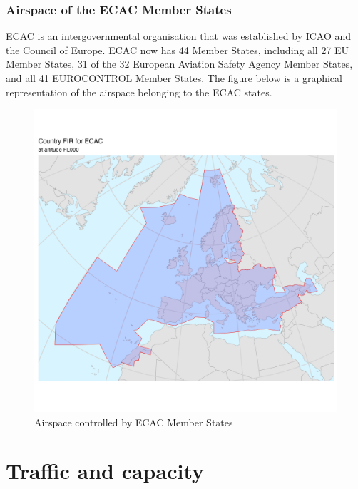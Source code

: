 \documentclass[
  11pt,
  a4paper,
]{book}
\begin{document}
\hypertarget{airspace-of-the-ecac-member-states}{%
\section*{Airspace of the ECAC Member
States}\label{airspace-of-the-ecac-member-states}}


ECAC is an intergovernmental organisation that was established by ICAO
and the Council of Europe. ECAC now has 44 Member States, including all
27 EU Member States, 31 of the 32 European Aviation Safety Agency Member
States, and all 41 EUROCONTROL Member States. The figure below is a
graphical representation of the airspace belonging to the ECAC states.

\begin{figure}

{\centering \includegraphics{./figures/ecac_airspace_fir.png}

}

\caption{\label{fig-ecac-airspace-fir}Airspace controlled by ECAC Member
States}

\end{figure}

\part{Traffic and capacity}
\end{document}

